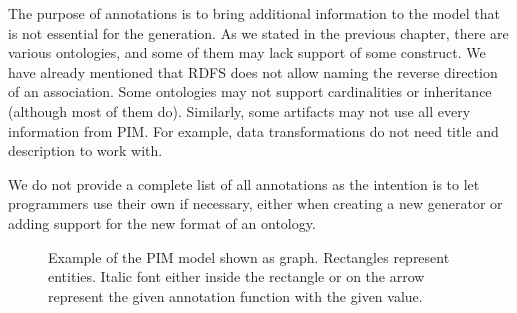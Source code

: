 The purpose of annotations is to bring additional information to the model that is not essential for the generation. As we stated in the previous chapter, there are various ontologies, and some of them may lack support of some construct. We have already mentioned that RDFS does not allow naming the reverse direction of an association. Some ontologies may not support cardinalities or inheritance (although most of them do). Similarly, some artifacts may not use all every information from PIM. For example, data transformations do not need title and description to work with.

We do not provide a complete list of all annotations as the intention is to let programmers use their own if necessary, either when creating a new generator or adding support for the new format of an ontology.

\begin{figure}[h!]\centering
\centering
{}

  \caption{Example of the PIM model shown as graph. Rectangles represent entities. Italic font either inside the rectangle or on the arrow represent the given annotation function with the given value. }
\end{figure}

